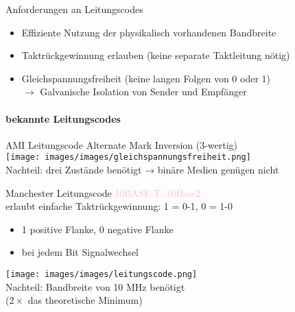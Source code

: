 \begin{KR}{Anforderungen an Leitungscodes}
\begin{itemize}
    \item Effiziente Nutzung der physikalisch vorhandenen Bandbreite
    \item Taktrückgewinnung erlauben (keine separate Taktleitung nötig)
    \item Gleichspannungsfreiheit (keine langen Folgen von 0 oder 1) \\ $\rightarrow$ Galvanische Isolation von Sender und Empfänger
\end{itemize} 
\end{KR}

\paragraph{bekannte Leitungscodes}

\begin{concept}{AMI Leitungscode} Alternate Mark Inversion (3-wertig)\\
    \texttt{[image: images/images/gleichspannungsfreiheit.png]}\\
    Nachteil: drei Zustände benötigt → binäre Medien genügen nicht
\end{concept}

\begin{concept}{Manchester Leitungscode} \textcolor{pink}{10BASE-T, 10Base2}\\
    erlaubt einfache Taktrückgewinnung: 1 = 0-1, 0 = 1-0
    \begin{itemize}
        \item 1 positive Flanke, 0 negative Flanke
        \item bei jedem Bit Signalwechsel
    \end{itemize}
    \texttt{[image: images/images/leitungscode.png]}\\
    Nachteil: Bandbreite von 10 MHz benötigt \\ ($2 \times$ das theoretische Minimum)
\end{concept}

